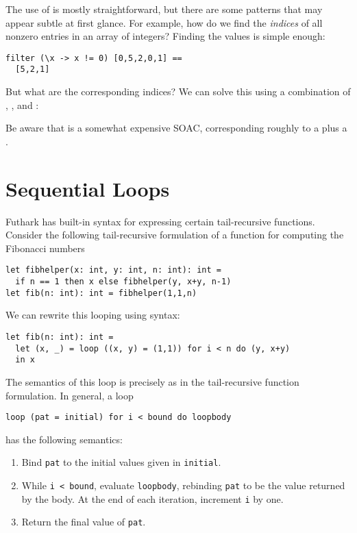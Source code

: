 \documentclass[oneside,11pt]{book}
\begin{document}
The use of  is mostly straightforward, but there are
some patterns that may appear subtle at first glance.  For example,
how do we find the \textit{indices} of all nonzero entries in an array
of integers?  Finding the values is simple enough:

\begin{lstlisting}
filter (\x -> x != 0) [0,5,2,0,1] ==
  [5,2,1]
\end{lstlisting}

\noindent
But what are the corresponding indices?  We can solve this using a
combination of , , and :



\noindent
Be aware that  is a somewhat expensive SOAC,
corresponding roughly to a  plus a .

\section{Sequential Loops}
\label{sec:sequential-loops}

Futhark has built-in syntax for expressing certain tail-recursive
functions.  Consider the following tail-recursive formulation of a
function for computing the Fibonacci numbers

\begin{lstlisting}
let fibhelper(x: int, y: int, n: int): int =
  if n == 1 then x else fibhelper(y, x+y, n-1)
let fib(n: int): int = fibhelper(1,1,n)
\end{lstlisting}

We can rewrite this looping using  syntax:

\begin{lstlisting}
let fib(n: int): int =
  let (x, _) = loop ((x, y) = (1,1)) for i < n do (y, x+y)
  in x
\end{lstlisting}

The semantics of this loop is precisely as in the tail-recursive function
formulation.  In general, a loop

\begin{lstlisting}
loop (pat = initial) for i < bound do loopbody
\end{lstlisting}

\noindent
has the following semantics:

\begin{enumerate}
\item Bind \texttt{pat} to the initial values given in
  \texttt{initial}.
\item While \texttt{i < bound}, evaluate \texttt{loopbody}, rebinding
  \texttt{pat} to be the value returned by the body.  At the end of
  each iteration, increment \texttt{i} by one.
\item Return the final value of \texttt{pat}.
\end{enumerate}
\end{document}
